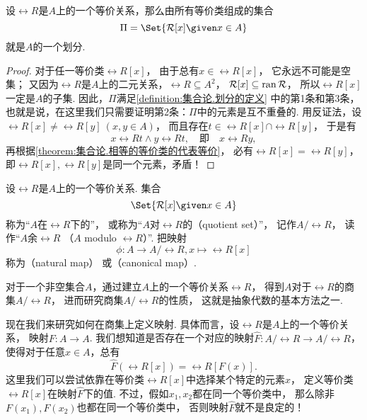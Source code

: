 \begin{theorem}
设\(\rel{R}\)是\(A\)上的一个等价关系，那么由所有等价类组成的集合\begin{equation*}
	\Pi = \Set{ \rel{R}[x] \given x \in A }
\end{equation*}就是\(A\)的一个划分.
\begin{proof}
对于任一等价类\(\rel{R}[x]\)，
由于总有\(x \in \rel{R}[x]\)，
它永远不可能是空集；
又因为\(\rel{R}\)是\(A\)上的二元关系，\(\rel{R} \subseteq A^2\)，
\(\mathcal{R}[x] \subseteq \operatorname{ran} \mathcal{R}\)，
所以\(\rel{R}[x]\)一定是\(A\)的子集.
因此，\(\Pi\)满足\cref{definition:集合论.划分的定义} 中的第1条和第3条，
也就是说，在这里我们只需要证明第2条：\(\Pi\)中的元素是互不重叠的.
用反证法，设\(\rel{R}[x] \neq \rel{R}[y]\ (x,y \in A)\)，
而且存在\(t \in \rel{R}[x] \cap \rel{R}[y]\)，
于是有\begin{equation*}
	x \rel{R} t \land y \rel{R} t,
	\quad\text{即}\quad
	x \rel{R} y,
\end{equation*}
再根据\cref{theorem:集合论.相等的等价类的代表等价}，
必有\(\rel{R}[x] = \rel{R}[y]\)，
即\(\rel{R}[x],\rel{R}[y]\)是同一个元素，矛盾！
\end{proof}
\end{theorem}

\begin{definition}\label{definition:集合论.商集的定义}
设\(\rel{R}\)是\(A\)上的一个等价关系.
集合\begin{equation*}
	\Set{ \rel{R}[x] \given x \in A }
\end{equation*}称为“\(A\)在\(\rel{R}\)下的”，
或称为“\(A\)对\(\rel{R}\)的（quotient set）”，
记作\(A/\rel{R}\)，
读作“\(A\)余\(\rel{R}\)
（\(A\) modulo \(\rel{R}\)）”.
把映射\begin{equation*}
	\phi\colon A \to A/\rel{R}, x \mapsto \rel{R}[x]
\end{equation*}称为（natural map）%
或（canonical map）.
\end{definition}
对于一个非空集合\(A\)，通过建立\(A\)上的一个等价关系\(\rel{R}\)，
得到\(A\)对于\(\rel{R}\)的商集\(A/\rel{R}\)，
进而研究商集\(A/\rel{R}\)的性质，
这就是抽象代数的基本方法之一.

现在我们来研究如何在商集上定义映射.
具体而言，设\(\rel{R}\)是\(A\)上的一个等价关系，
映射\(F\colon A \to A\).
我们想知道是否存在一个对应的映射\(\hat{F}\colon A/\rel{R} \to A/\rel{R}\)，
使得对于任意\(x \in A\)，总有\begin{equation*}
	\hat{F}(\rel{R}[x]) = \rel{R}[F(x)].
\end{equation*}
这里我们可以尝试依靠在等价类\(\rel{R}[x]\)中选择某个特定的元素\(x\)，
定义等价类\(\rel{R}[x]\)在映射\(\hat{F}\)下的值.
不过，假如\(x_1,x_2\)都在同一个等价类中，
那么除非\(F(x_1),F(x_2)\)也都在同一个等价类中，
否则映射\(\hat{F}\)就不是良定的！

